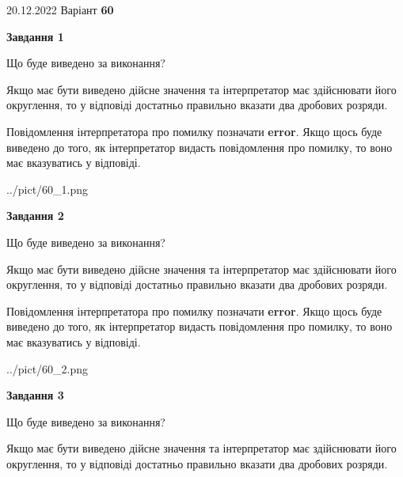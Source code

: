 \documentclass[12pt, ukrainian]{article}
\begin{document}
{20.12.2022 Варіант \No \textbf { 60 }\par}
{
\begin {Large}

{\begin {center}\textbf{Завдання 1}\end {center}}\par
Що буде виведено за виконання? \par

Якщо має бути виведено дійсне значення та інтерпретатор має здійснювати його округлення, 
то у відповіді достатньо правильно вказати два дробових розряди.

Повідомлення інтерпретатора про помилку позначати \textbf{error}.
Якщо щось буде виведено до того, як інтерпретатор видасть повідомлення про помилку, 
то воно має вказуватись у відповіді. \par

\begin{center}
	{../pict/60_1.png}
\end{center}
\newpage

{\begin {center}\textbf{Завдання 2}\end {center}}\par
Що буде виведено за виконання? \par

Якщо має бути виведено дійсне значення та інтерпретатор має здійснювати його округлення, 
то у відповіді достатньо правильно вказати два дробових розряди.

Повідомлення інтерпретатора про помилку позначати \textbf{error}.
Якщо щось буде виведено до того, як інтерпретатор видасть повідомлення про помилку, 
то воно має вказуватись у відповіді. \par

\begin{center}
	{../pict/60_2.png}
\end{center}
\newpage

{\begin {center}\textbf{Завдання 3}\end {center}}\par
Що буде виведено за виконання? \par

Якщо має бути виведено дійсне значення та інтерпретатор має здійснювати його округлення, 
то у відповіді достатньо правильно вказати два дробових розряди.


\end{Large}}
\end{document}
